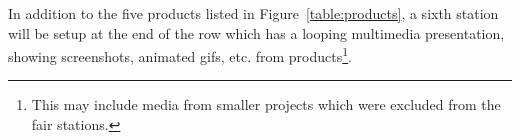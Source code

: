 \documentclass{GlobalDocument}
\begin{document}
In addition to the five products listed in Figure~\ref{table:products}, a sixth station will be setup at the end of the row which has a looping multimedia presentation, showing screenshots, animated gifs, etc. from \ourengine{} products\footnote{This may include media from smaller projects which were excluded from the fair stations.}.
\end{document}
